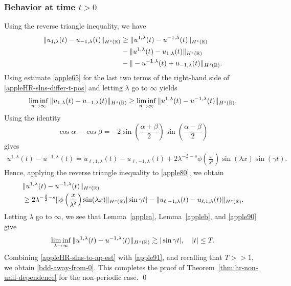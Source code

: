 \subsubsection{Behavior at time  $t>0$}  Using the reverse triangle inequality, we 
have
%
%
%
%
%
\begin{equation} \label{appleHR-slns-differ-t-pos}
\begin{split}
\|
u_{1,\lambda}(t)
-
u_{- 1,\lambda}(t)
\|_{H^s(\mathbb{R})}
&
\ge
\|
u^{1,\lambda}(t)
-
u^{- 1,\lambda}(t)
\|_{H^s(\mathbb{R})}
\\
& -
\|
u^{1,\lambda}(t)
-
u_{1,\lambda}(t)
\|_{H^s(\mathbb{R})}
\\
& -
\|
-u^{-1,\lambda}(t)
+
u_{-1,\lambda}(t)
\|_{H^s(\mathbb{R})}.
\end{split}
\end{equation}
%
%
%
%
Using estimate \eqref{apple65} for the last two terms of 
the right-hand side of \eqref{appleHR-slns-differ-t-pos} 
and letting $\lambda$ go to $\infty$ 
yields
%
%
%
\begin{equation} \label{appleHR-slns-to-ap-est}
\liminf_{n\to\infty}
\|
u_{1,\lambda}(t)
-
u_{- 1,\lambda}(t)
\|_{H^s(\mathbb{R})}
\ge
\liminf_{n\to\infty}
\|
u^{1,\lambda}(t)
-
u^{- 1,\lambda}(t)
\|_{H^s(\mathbb{R})}.
\end{equation}
%
%
%
%
Using the identity $$
\cos \alpha -\cos \beta
=
-2
\sin(\frac{\alpha + \beta}{2})
\sin(\frac{\alpha - \beta}{2})
$$
gives
%
%
\begin{equation}
\label{apple80}
\begin{split}
u^{1,\lambda}(t)
-
u^{- 1,\lambda}(t)
=
u_{\ell,1,\lambda}(t) - u_{\ell,-1,\lambda}(t) + 
2\lambda^{-\frac{\delta}{2}-s}
\phi\left( \frac{x}{\lambda^\delta} \right)\sin(\lambda x) \sin(\gamma t).
\end{split}
\end{equation}
%
%
%
Hence, applying the reverse triangle inequality to \eqref{apple80}, we 
obtain
%
%
\begin{equation} \label{apple90}
\begin{split}
& \|
u^{1,\lambda}(t)
-
u^{- 1,\lambda}(t)
\|_{H^s(\mathbb{R})}
\\
& \ge 2 \lambda^{-\frac{\delta}{2}-s} \|\phi\left(
\frac{x}{\lambda^\delta} \right) \sin(\lambda x) \|_{H^s(\mathbb{R})} |\sin \gamma 
t|
- \|u_{\ell,-1,\lambda}(t) - u_{\ell,1,\lambda}(t)\|_{H^s(\mathbb{R})}.
\end{split}
\end{equation}
%
%
%
%
Letting $\lambda$ go to $\infty$, we see that Lemma~\ref{applea}, Lemma~\ref{appleb}, and \eqref{apple90} give
%
%
%
%
\begin{equation} \label{apple91}
\liminf_{\lambda \to\infty}
\|
u^{1,\lambda}(t)
-
u^{- 1,\lambda}(t)
\|_{H^s(\mathbb{R})}
\gtrsim
|\sin \gamma t|, \quad |t| \le T.
\end{equation}
%
%
Combining \eqref{appleHR-slns-to-ap-est} with \eqref{apple91}, and 
recalling that $T >>1$, we obtain \eqref{bdd-away-from-0}. This completes 
the proof of Theorem~\ref{thm:hr-non-unif-dependence} for the
non-periodic case.  \qed
%
%
%
%
%
%
%
%
